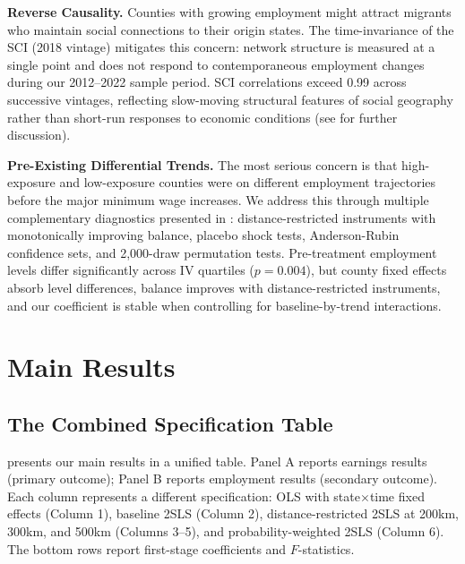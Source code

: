 \documentclass[12pt]{article}
\begin{document}
\textbf{Reverse Causality.} Counties with growing employment might attract migrants who maintain social connections to their origin states. The time-invariance of the SCI (2018 vintage) mitigates this concern: network structure is measured at a single point and does not respond to contemporaneous employment changes during our 2012--2022 sample period. SCI correlations exceed 0.99 across successive vintages, reflecting slow-moving structural features of social geography rather than short-run responses to economic conditions (see  for further discussion).

\textbf{Pre-Existing Differential Trends.} The most serious concern is that high-exposure and low-exposure counties were on different employment trajectories before the major minimum wage increases. We address this through multiple complementary diagnostics presented in : distance-restricted instruments with monotonically improving balance, placebo shock tests, Anderson-Rubin confidence sets, and 2,000-draw permutation tests. Pre-treatment employment levels differ significantly across IV quartiles ($p = 0.004$), but county fixed effects absorb level differences, balance improves with distance-restricted instruments, and our coefficient is stable when controlling for baseline-by-trend interactions.


\section{Main Results}
\label{sec:results}

\subsection{The Combined Specification Table}

 presents our main results in a unified table. Panel A reports earnings results (primary outcome); Panel B reports employment results (secondary outcome). Each column represents a different specification: OLS with state$\times$time fixed effects (Column 1), baseline 2SLS (Column 2), distance-restricted 2SLS at 200km, 300km, and 500km (Columns 3--5), and probability-weighted 2SLS (Column 6). The bottom rows report first-stage coefficients and $F$-statistics.
\end{document}
